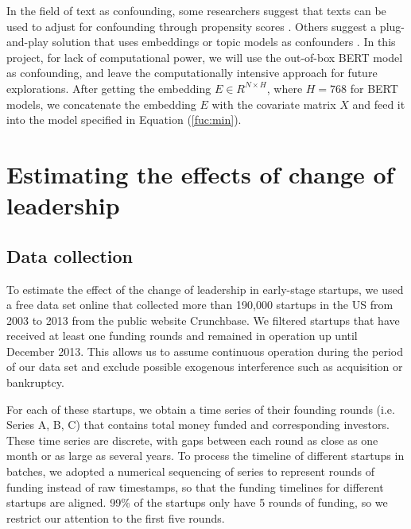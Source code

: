 \documentclass[12pt]{article}
\begin{document}
In the field of text as confounding, some researchers suggest that texts can be used to adjust for confounding through propensity scores \cite{weld2020adjusting}. Others suggest a plug-and-play solution that uses embeddings or topic models as confounders \cite{keith2020text,veitch2020adapting}. In this project, for lack of computational power, we will use the out-of-box BERT model \cite{devlin2018bert} as confounding, and leave the computationally intensive approach for future explorations. After getting the embedding $E \in R^{N \times H}$, where $H = 768$ for BERT models, we concatenate the embedding $E$ with the covariate matrix $X$ and feed it into the model specified in Equation (\ref{fuc:min}).

\section{Estimating the effects of change of leadership}
\label{sec:estimate}

\subsection{Data collection}

To estimate the effect of the change of leadership in early-stage startups, we used a free data set online that collected more than 190,000 startups in the US from 2003 to 2013 from the public website Crunchbase. We filtered startups that have received at least one funding rounds and remained in operation up until December 2013. This allows us to assume continuous operation during the period of our data set and exclude possible exogenous interference such as acquisition or bankruptcy.

For each of these startups, we obtain a time series of their founding rounds (i.e. Series A, B, C) that contains total money funded and corresponding investors. These time series are discrete, with gaps between each round as close as one month or as large as several years. To process the timeline of different startups in batches, we adopted a numerical sequencing of series to represent rounds of funding instead of raw timestamps, so that the funding timelines for different startups are aligned. 99\% of the startups only have 5 rounds of funding, so we restrict our attention to the first five rounds.
\end{document}
